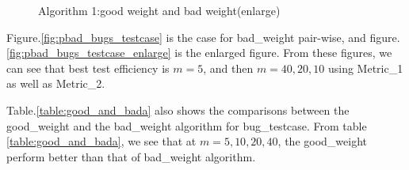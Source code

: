 \documentclass[10pt,conference, compsocconf]{IEEEtran}
\begin{document}
\begin{CJK}{UTF8}{gkai}
 \begin{figure}
   \centering
\caption{Algorithm 1:good weight and bad weight(enlarge)}
 \end{figure}

Figure.\ref{fig:pbad_bugs_testcase} is the case for bad\_weight pair-wise, and
figure.\ref{fig:pbad_bugs_testcase_enlarge} is the enlarged figure. 
From these figures, we can see that best test efficiency is  
$m=5$, and then $m=40,20,10$ using Metric\_1 as well as Metric\_2.  

Table.\ref{table:good_and_bada} also shows the
comparisons between the good\_weight and the 
bad\_weight algorithm for bug\_testcase. From table \ref{table:good_and_bada}, 
we see that at $m=5,10,20,40$, the good\_weight perform better than 
that of bad\_weight algorithm. 


\end{CJK}
\end{document}
